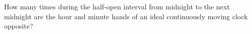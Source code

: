 How many times during the half-open interval from midnight to the next midnight are the hour and minute hands of an ideal continuously moving clock opposite?
